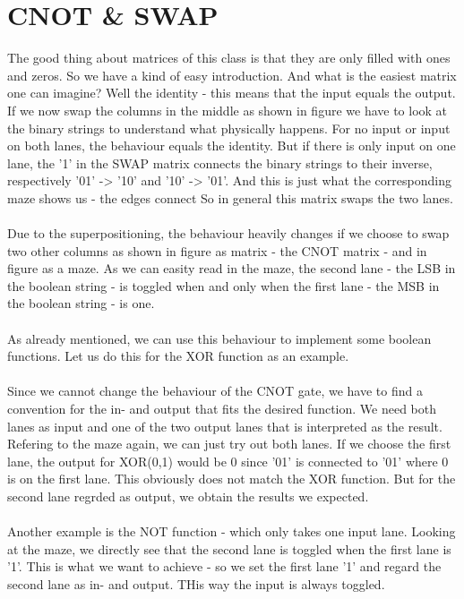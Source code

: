 \documentclass[oneside]{thesisclass}
\begin{document}
\section{CNOT \& SWAP}
The good thing about matrices of this class is that they are only filled with ones and zeros.
So we have a kind of easy introduction.
And what is the easiest matrix one can imagine?
Well the identity - this means that the input equals the output.
If we now swap the columns in the middle as shown in figure %
we have to look at the binary strings to understand what physically happens.
For no input or input on both lanes, the behaviour equals the identity.
But if there is only input on one lane, the '1' in the SWAP matrix connects the binary strings to their inverse, respectively '01' -> '10' and '10' -> '01'.
And this is just what the corresponding maze%
shows us - the edges connect%
So in general this matrix swaps the two lanes.\\
\\Due to the superpositioning, the behaviour heavily changes if we choose to swap two other columns as shown in figure%
as matrix - the CNOT matrix - and in figure%
as a maze.
As we can easity read in the maze, the second lane - the LSB in the boolean string - is toggled when and only when the first lane - the MSB in the boolean string - is one.\\
\\As already mentioned, we can use this behaviour to implement some boolean functions.
Let us do this for the XOR function as an example.\\
\\Since we cannot change the behaviour of the CNOT gate, we have to find a convention for the in- and output that fits the desired function.
We need both lanes as input and one of the two output lanes that is interpreted as the result.
Refering to the maze again, we can just try out both lanes.
If we choose the first lane, the output for XOR(0,1) would be 0 since '01' is connected to '01' where 0 is on the first lane.
This obviously does not match the XOR function.
But for the second lane regrded as output, we obtain the results we expected.\\
\\Another example is the NOT function - which only takes one input lane.
Looking at the maze, we directly see that the second lane is toggled when the first lane is '1'.
This is what we want to achieve - so we set the first lane '1' and regard the second lane as in- and output.
THis way the input is always toggled.
\end{document}
